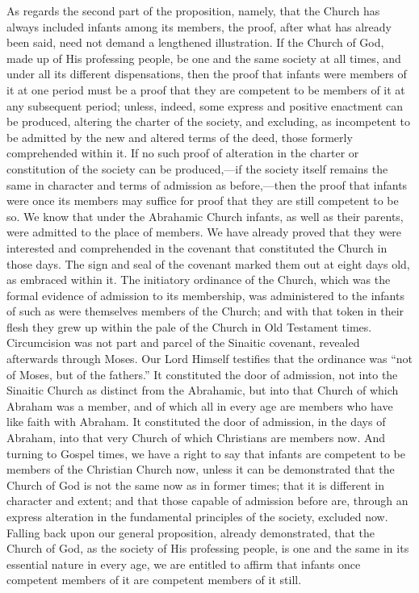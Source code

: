 \documentclass[]{book}
\begin{document}
As regards the second part of the proposition, namely, that the Church has always included infants among its members, the proof, after what has already been said, need not demand a lengthened illustration. If the Church of God, made up of His professing people, be one and the same society at all times, and under all its different dispensations, then the proof that infants were members of it at one period must be a proof that they are competent to be members of it at any subsequent period; unless, indeed, some express and positive enactment can be produced, altering the charter of the society, and excluding, as incompetent to be admitted by the new and altered terms of the deed, those formerly comprehended within it. If no such proof of alteration in the charter or constitution of the society can be produced,---if the society itself remains the same in character and terms of admission as before,---then the proof that infants were once its members may suffice for proof that they are still competent to be so. We know that under the Abrahamic Church infants, as well as their parents, were admitted to the place of members. We have already proved that they were interested and comprehended in the covenant that constituted the Church in those days. The sign and seal of the covenant marked them out at eight days old, as embraced within it. The initiatory ordinance of the Church, which was the formal evidence of admission to its membership, was administered to the infants of such as were themselves members of the Church; and with that token in their flesh they grew up within the pale of the Church in Old Testament times. Circumcision was not part and parcel of the Sinaitic covenant, revealed afterwards through Moses. Our Lord Himself testifies that the ordinance was ``not of Moses, but of the fathers.'' It constituted the door of admission, not into the Sinaitic Church as distinct from the Abrahamic, but into that Church of which Abraham was a member, and of which all in every age are members who have like faith with Abraham. It constituted the door of admission, in the days of Abraham, into that very Church of which Christians are members now. And turning to Gospel times, we have a right to say that infants are competent to be members of the Christian Church now, unless it can be demonstrated that the Church of God is not the same now as in former times; that it is different in character and extent; and that those capable of admission before are, through an express alteration in the fundamental principles of the society, excluded now. Falling back upon our general proposition, already demonstrated, that the Church of God, as the society of His professing people, is one and the same in its essential nature in every age, we are entitled to affirm that infants once competent members of it are competent members of it still.
\end{document}

